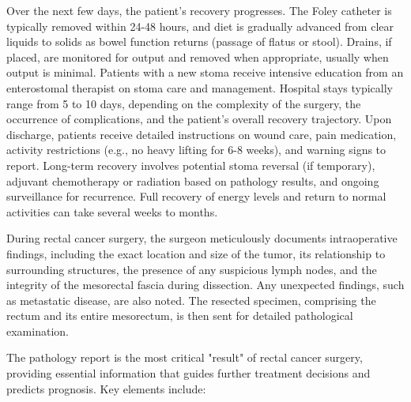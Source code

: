 Over the next few days, the patient's recovery progresses. The Foley catheter is typically removed within 24-48 hours, and diet is gradually advanced from clear liquids to solids as bowel function returns (passage of flatus or stool). Drains, if placed, are monitored for output and removed when appropriate, usually when output is minimal. Patients with a new stoma receive intensive education from an enterostomal therapist on stoma care and management. Hospital stays typically range from 5 to 10 days, depending on the complexity of the surgery, the occurrence of complications, and the patient's overall recovery trajectory. Upon discharge, patients receive detailed instructions on wound care, pain medication, activity restrictions (e.g., no heavy lifting for 6-8 weeks), and warning signs to report. Long-term recovery involves potential stoma reversal (if temporary), adjuvant chemotherapy or radiation based on pathology results, and ongoing surveillance for recurrence. Full recovery of energy levels and return to normal activities can take several weeks to months.

During rectal cancer surgery, the surgeon meticulously documents intraoperative findings, including the exact location and size of the tumor, its relationship to surrounding structures, the presence of any suspicious lymph nodes, and the integrity of the mesorectal fascia during dissection. Any unexpected findings, such as metastatic disease, are also noted. The resected specimen, comprising the rectum and its entire mesorectum, is then sent for detailed pathological examination.

The pathology report is the most critical "result" of rectal cancer surgery, providing essential information that guides further treatment decisions and predicts prognosis. Key elements include:

